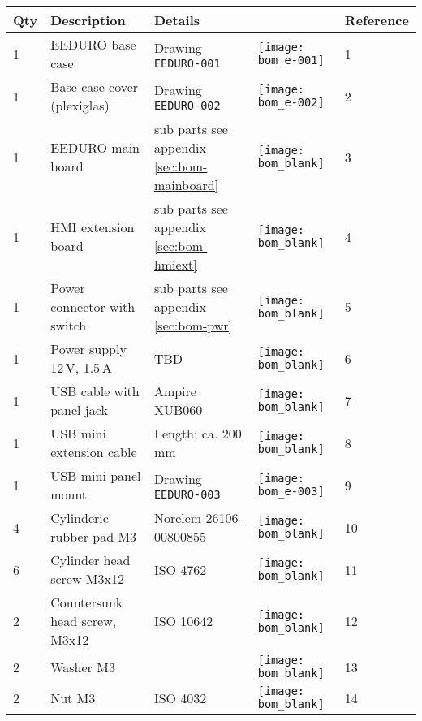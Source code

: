\begin{tabular}{m{0.5cm} m{5cm} m{5cm} m{1cm} m{1.5cm}}
\bfseries Qty  & \bfseries Description              & \bfseries Details                              &                                           & \bfseries Reference\\
\hline
1    & EEDURO base case                             & Drawing \texttt{EEDURO-001}                    & \texttt{[image: bom\_e-001]}   & 1   \\
\hline
1    & Base case cover (plexiglas)                  & Drawing \texttt{EEDURO-002}                    & \texttt{[image: bom\_e-002]}   & 2   \\
\hline
1    & EEDURO main board                            & sub parts see appendix \ref{sec:bom-mainboard} & \texttt{[image: bom\_blank]}   & 3   \\
\hline
1    & HMI extension board                          & sub parts see appendix \ref{sec:bom-hmiext}    & \texttt{[image: bom\_blank]}   & 4   \\
\hline
1    & Power connector with switch                  & sub parts see appendix \ref{sec:bom-pwr}       & \texttt{[image: bom\_blank]}   & 5   \\
\hline
1    & Power supply 12\,V, 1.5\,A                   & TBD                                            & \texttt{[image: bom\_blank]}   & 6   \\
\hline
1    & USB cable with panel jack                    & Ampire XUB060                                  & \texttt{[image: bom\_blank]}   & 7   \\
\hline
1    & USB mini extension cable                     & Length: ca. 200\,mm                            & \texttt{[image: bom\_blank]}   & 8   \\
\hline
1    & USB mini panel mount                         & Drawing \texttt{EEDURO-003}                    & \texttt{[image: bom\_e-003]}   & 9   \\
\hline
4    & Cylinderic rubber pad M3                     & Norelem 26106-00800855                         & \texttt{[image: bom\_blank]}   & 10   \\
\hline
6    & Cylinder head screw M3x12                    & ISO 4762                                       & \texttt{[image: bom\_blank]}   & 11   \\
\hline
2    & Countersunk head screw, M3x12                & ISO 10642                                      & \texttt{[image: bom\_blank]}   & 12   \\
\hline
2    & Washer M3                                    &                                                & \texttt{[image: bom\_blank]}   & 13   \\
\hline
2    & Nut M3                                       & ISO 4032                                       & \texttt{[image: bom\_blank]}   & 14   \\
\hline
\end{tabular}

